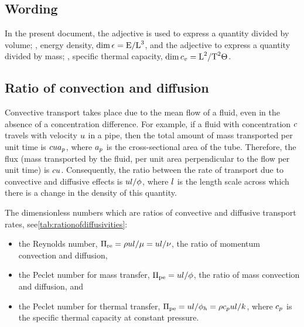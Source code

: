 \subsection{Wording}
In the present document, the adjective  is used to express a quantity divided by volume; \eg, energy density, $\dim\epsilon = \text{E}/\text{L}^3$, and  the adjective  to express a quantity divided by mass; \eg, specific thermal capacity, $\dim c_v = \text{L}^2/\text{T}^2\Theta$.


\subsection{Ratio of convection and diffusion}
Convective transport takes place due to the mean flow of a fluid, even in the absence of a concentration difference. For example, if a fluid with concentration $c$ travels with velocity $u$ in a pipe, then the total amount of mass transported per unit time is $cua_p$, where $a_p$ is the cross-sectional area of the tube. Therefore, the flux (mass transported by the fluid, per unit area perpendicular to the flow per unit time) is $cu$. Consequently, the ratio between the rate of transport due to convective and diffusive effects is $ul/\phi$, where $l$ is the length scale across which there is a change in the density of this quantity.

The dimensionless numbers which are ratios of convective and diffusive transport rates, see\cref{tab:rationofdiffusivities}: 
%
\begin{itemize}
\item the Reynolds number, $\Pi_\text{re} = \rho ul/\mu = ul/\nu$, the ratio of momentum convection and diffusion,

\item the Peclet number for mass transfer, $\Pi_\text{pe} = ul/\phi$, the ratio of mass convection and diffusion, and

\item the Peclet number for thermal transfer, $\Pi_\text{pe} = ul/\phi_h = \rho c_pul/k$, where $c_p$ is the specific thermal capacity at constant pressure.
\end{itemize}


